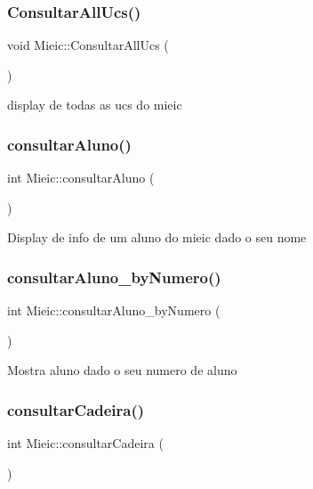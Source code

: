 \subsubsection{\texorpdfstring{Consultar\+All\+Ucs()}{ConsultarAllUcs()}}
{\footnotesize\ttfamily void Mieic\+::\+Consultar\+All\+Ucs (\begin{DoxyParamCaption}{ }\end{DoxyParamCaption})}

display de todas as ucs do mieic \hypertarget{class_mieic_a48e0f6b686af40c81362e9f8cf35051e}{}\label{class_mieic_a48e0f6b686af40c81362e9f8cf35051e} 
\subsubsection{\texorpdfstring{consultar\+Aluno()}{consultarAluno()}}
{\footnotesize\ttfamily int Mieic\+::consultar\+Aluno (\begin{DoxyParamCaption}{ }\end{DoxyParamCaption})}

Display de info de um aluno do mieic dado o seu nome \hypertarget{class_mieic_a7157f30b230bae277b3270ae5cfa54fb}{}\label{class_mieic_a7157f30b230bae277b3270ae5cfa54fb} 
\subsubsection{\texorpdfstring{consultar\+Aluno\+\_\+by\+Numero()}{consultarAluno\_byNumero()}}
{\footnotesize\ttfamily int Mieic\+::consultar\+Aluno\+\_\+by\+Numero (\begin{DoxyParamCaption}{ }\end{DoxyParamCaption})}

Mostra aluno dado o seu numero de aluno \hypertarget{class_mieic_a258308b6c121103c1de1740e5ec2318b}{}\label{class_mieic_a258308b6c121103c1de1740e5ec2318b} 
\subsubsection{\texorpdfstring{consultar\+Cadeira()}{consultarCadeira()}}
{\footnotesize\ttfamily int Mieic\+::consultar\+Cadeira (\begin{DoxyParamCaption}{ }\end{DoxyParamCaption})}

